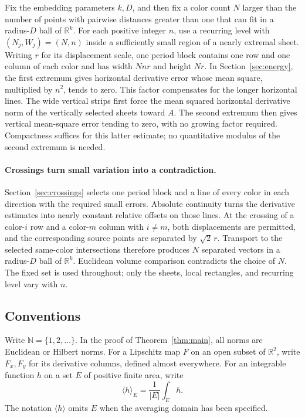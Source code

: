 \documentclass[11pt]{article}
\newcommand{\R}{\mathbb R}
\newcommand{\N}{\mathbb N}
\begin{document}
Fix the embedding parameters $k,D$, and then fix a color count $N$ larger than the number of points with pairwise distances greater than one that can fit in a radius-$D$ ball of $\R^k$. For each positive integer $n$, use a recurring level with $(N_j,W_j)=(N,n)$ inside a sufficiently small region of a nearly extremal sheet. Writing $r$ for its displacement scale, one period block contains one row and one column of each color and has width $Nnr$ and height $Nr$. In Section~\ref{sec:energy}, the first extremum gives horizontal derivative error whose mean square, multiplied by $n^2$, tends to zero. This factor compensates for the longer horizontal lines. The wide vertical strips first force the mean squared horizontal derivative norm of the vertically selected sheets toward $A$. The second extremum then gives vertical mean-square error tending to zero, with no growing factor required. Compactness suffices for this latter estimate; no quantitative modulus of the second extremum is needed.

\paragraph{Crossings turn small variation into a contradiction.}
Section~\ref{sec:crossings} selects one period block and a line of every color in each direction with the required small errors. Absolute continuity turns the derivative estimates into nearly constant relative offsets on those lines. At the crossing of a color-$i$ row and a color-$m$ column with $i\ne m$, both displacements are permitted, and the corresponding source points are separated by $\sqrt2\,r$. Transport to the selected same-color intersections therefore produces $N$ separated vectors in a radius-$D$ ball of $\R^k$. Euclidean volume comparison contradicts the choice of $N$. The fixed set is used throughout; only the sheets, local rectangles, and recurring level vary with $n$.

\subsection{Conventions}
Write $\N=\{1,2,\ldots\}$. In the proof of Theorem~\ref{thm:main}, all norms are Euclidean or Hilbert norms. For a Lipschitz map $F$ on an open subset of $\R^2$, write $F_x,F_y$ for its derivative columns, defined almost everywhere. For an integrable function $h$ on a set $E$ of positive finite area, write
\[
 \langle h\rangle_E=\frac{1}{|E|}\int_E h.
\]
The notation $\langle h\rangle$ omits $E$ when the averaging domain has been specified.
\end{document}
